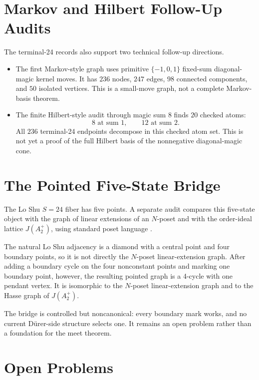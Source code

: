 \documentclass[11pt,a4paper]{article}
\theoremstyle{definition}
\theoremstyle{remark}
\newcommand{\Durer}{D\"urer\xspace}
\begin{document}
\section{Markov and Hilbert Follow-Up Audits}
\label{app:markov-hilbert}

The terminal-24 records also support two technical follow-up directions.

\begin{itemize}[leftmargin=*]
\item The first Markov-style graph uses primitive \(\{-1,0,1\}\) fixed-sum
diagonal-magic kernel moves.  It has \(236\) nodes, \(247\) edges, \(98\)
connected components, and \(50\) isolated vertices.  This is a small-move
graph, not a complete Markov-basis theorem.
\item The finite Hilbert-style audit through magic sum \(8\) finds \(20\)
checked atoms:
\[
8\text{ at sum }1,\qquad 12\text{ at sum }2.
\]
All \(236\) terminal-24 endpoints decompose in this checked atom set.  This
is not yet a proof of the full Hilbert basis of the nonnegative
diagonal-magic cone.
\end{itemize}

\section{The Pointed Five-State Bridge}
\label{app:five-state}

The Lo Shu \(S=24\) fiber has five points.  A separate audit compares this
five-state object with the graph of linear extensions of an \(N\)-poset and
with the order-ideal lattice \(J(A_2^+)\), using standard poset language
\cite{naatzLinearExtensions,stanleyPosetPolytopes}.

The natural Lo Shu adjacency is a diamond with a central point and four
boundary points, so it is not directly the \(N\)-poset linear-extension
graph.  After adding a boundary cycle on the four nonconstant points and
marking one boundary point, however, the resulting pointed graph is a
4-cycle with one pendant vertex.  It is isomorphic to the \(N\)-poset
linear-extension graph and to the Hasse graph of \(J(A_2^+)\).

The bridge is controlled but noncanonical: every boundary mark works, and no
current \Durer-side structure selects one.  It remains an open problem rather
than a foundation for the meet theorem.

\section{Open Problems}
\label{app:open}
\end{document}
